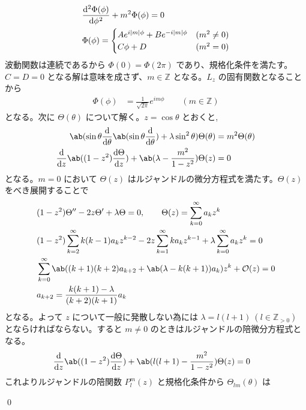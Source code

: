\documentclass[uplatex,dvipdfmx,a4paper,11pt]{jlreq}
\makeatletter
\newcommand{\ZZ}{\mathbb{Z}}
\numberwithin{equation}{section}
\theoremstyle{definition}
\renewenvironment{proof}[1][\proofname]{\par
  \normalfont
  \topsep6\p@\@plus6\p@ \trivlist
  \item[\hskip\labelsep{\bfseries #1}\@addpunct{\bfseries}]\ignorespaces\quad\par
}{%
  \qed\endtrivlist\@endpefalse
}
\renewcommand\proofname{証明}
\makeatother
\begin{document}
\begin{proof}
  \begin{align}
     & \diff[2]{\Phi(\phi)}{\phi} + m^2\Phi(\phi) = 0             \\
     & \Phi(\phi) = \begin{cases}
                      Ae^{i|m|\phi} + Be^{-i|m|\phi} & (m^2 \neq 0) \\
                      C\phi + D                      & (m^2 = 0)    \\
                    \end{cases}
  \end{align}
  波動関数は連続であるから $\Phi(0) = \Phi(2\pi)$ であり、規格化条件を満たす。$C = D = 0$ となる解は意味を成さず、$m\in\ZZ$ となる。$L_z$ の固有関数となることから
  \begin{align}
    \Phi(\phi) & = \frac{1}{\sqrt{2\pi}}e^{im\phi} \qquad (m\in\ZZ)
  \end{align}
  となる。次に $\Theta(\theta)$ について解く。$z = \cos\theta$ とおくと,
  \begin{align}
    \ab(\sin\theta\diff{}{\theta}\ab(\sin\theta\diff{}{\theta}) + \lambda \sin^2\theta)\Theta(\theta) & = m^2\Theta(\theta) \\
    \diff{}{z}\ab((1 - z^2)\diff{\Theta}{z}) + \ab(\lambda - \frac{m^2}{1 - z^2})\Theta(z)            & = 0
  \end{align}
  となる。$m = 0$ において $\Theta(z)$ はルジャンドルの微分方程式を満たす。$\Theta(z)$ をべき展開することで
  \begin{align}
     & (1 - z^2)\Theta'' - 2z\Theta' + \lambda\Theta = 0, \qquad \Theta(z) = \sum_{k = 0}^\infty a_kz^k                          \\
     & (1 - z^2)\sum_{k = 2}^\infty k(k-1)a_kz^{k-2} - 2z\sum_{k = 1}^\infty ka_kz^{k-1} + \lambda\sum_{k = 0}^\infty a_kz^k = 0 \\
     & \sum_{k = 0}^\infty \ab((k+1)(k+2)a_{k+2} + \ab(\lambda - k(k+1))a_k)z^k + \mathcal{O}(z) = 0                             \\
     & a_{k+2} = \frac{k(k+1) - \lambda}{(k+2)(k+1)}a_k
  \end{align}
  となる。よって $z$ について一般に発散しない為には $\lambda = l(l+1)\ (l\in\ZZ_{>0})$ とならければならない。すると $m\neq 0$ のときはルジャンドルの陪微分方程式となる。
  \begin{align}
    \diff{}{z}\ab((1 - z^2)\diff{\Theta}{z}) + \ab(l(l+1) - \frac{m^2}{1 - z^2})\Theta(z) & = 0
  \end{align}
  これよりルジャンドルの陪関数 $P_l^m(z)$ と規格化条件から $\Theta_{lm}(\theta)$ は

\end{proof}
\end{document}
